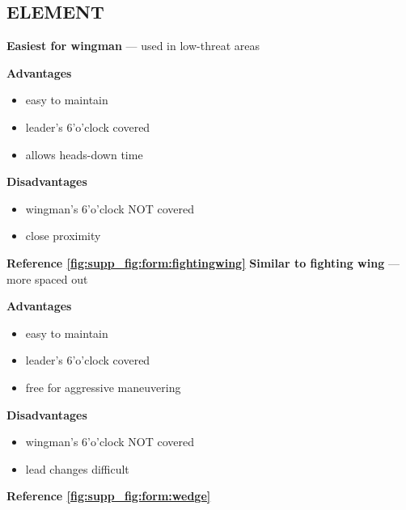 \subsection{ELEMENT}

\begin{tcoloritemize}
    \textbf{Easiest for wingman} --- used in low-threat areas

    \medskip

    \textbf{Advantages}
    \begin{itemize}
        \item easy to maintain
        \item leader's 6'o'clock covered
        \item allows heads-down time
    \end{itemize}

    \textbf{Disadvantages}
    \begin{itemize}
        \item wingman's 6'o'clock NOT covered
        \item close proximity
    \end{itemize}

    \hfill\textbf{Reference \cref{fig:supp_fig:form:fightingwing}}
    \blueitem[Wedge]
    \textbf{Similar to fighting wing} --- more spaced out
    
    \medskip

    \textbf{Advantages}
    \begin{itemize}
        \item easy to maintain
        \item leader's 6'o'clock covered
        \item free for aggressive maneuvering
    \end{itemize}

    \textbf{Disadvantages}
    \begin{itemize}
        \item wingman's 6'o'clock NOT covered
        \item lead changes difficult
    \end{itemize}

    \hfill\textbf{Reference \cref{fig:supp_fig:form:wedge}}
\end{tcoloritemize}

